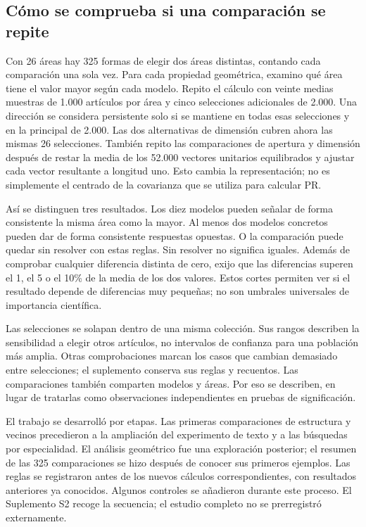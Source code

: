 \documentclass[12pt]{article}
\begin{document}
\subsection{Cómo se comprueba si una comparación se repite}
Con 26 áreas hay 325 formas de elegir dos áreas distintas, contando cada comparación una sola vez. Para cada propiedad geométrica, examino qué área tiene el valor mayor según cada modelo. Repito el cálculo con veinte medias muestras de 1.000 artículos por área y cinco selecciones adicionales de 2.000. Una dirección se considera persistente solo si se mantiene en todas esas selecciones y en la principal de 2.000. Las dos alternativas de dimensión cubren ahora las mismas 26 selecciones. También repito las comparaciones de apertura y dimensión después de restar la media de los 52.000 vectores unitarios equilibrados y ajustar cada vector resultante a longitud uno. Esto cambia la representación; no es simplemente el centrado de la covarianza que se utiliza para calcular PR.

Así se distinguen tres resultados. Los diez modelos pueden señalar de forma consistente la misma área como la mayor. Al menos dos modelos concretos pueden dar de forma consistente respuestas opuestas. O la comparación puede quedar sin resolver con estas reglas. Sin resolver no significa iguales. Además de comprobar cualquier diferencia distinta de cero, exijo que las diferencias superen el 1, el 5 o el 10\% de la media de los dos valores. Estos cortes permiten ver si el resultado depende de diferencias muy pequeñas; no son umbrales universales de importancia científica.

Las selecciones se solapan dentro de una misma colección. Sus rangos describen la sensibilidad a elegir otros artículos, no intervalos de confianza para una población más amplia. Otras comprobaciones marcan los casos que cambian demasiado entre selecciones; el suplemento conserva sus reglas y recuentos. Las comparaciones también comparten modelos y áreas. Por eso se describen, en lugar de tratarlas como observaciones independientes en pruebas de significación.

El trabajo se desarrolló por etapas. Las primeras comparaciones de estructura y vecinos precedieron a la ampliación del experimento de texto y a las búsquedas por especialidad. El análisis geométrico fue una exploración posterior; el resumen de las 325 comparaciones se hizo después de conocer sus primeros ejemplos. Las reglas se registraron antes de los nuevos cálculos correspondientes, con resultados anteriores ya conocidos. Algunos controles se añadieron durante este proceso. El Suplemento S2 recoge la secuencia; el estudio completo no se prerregistró externamente.
\end{document}
